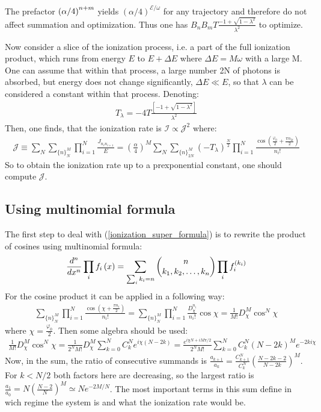 The prefactor $  \left(\alpha/4\right)^{n+m} $ yields $ (\alpha/4)^{\mathcal{E}/\omega} $ for any trajectory and therefore do not affect summation and optimization. Thus one has $ B_{n}B_{m}T\frac{-1+\sqrt{1-\lambda^{2}}}{\lambda^{2}} $ to optimize.

Now consider a slice of the ionization process, i.e. a part of the full ionization product, which runs from energy $ E $ to $ E+\Delta E $ where $ \Delta E=M\omega $ with a large M. One can assume that within that process, a large number 2N of photons is absorbed, but energy does not change significantly, $ \Delta E\ll E $, so that $ \lambda $ can be considered a constant within that process. Denoting:
\begin{gather}
	T_{\lambda}=-4T\frac{\left[-1+\sqrt{1-\lambda^{2}}\right]}{\lambda^{2}}
\end{gather}
Then, one finds, that the ionization rate is $ \mathcal{I}\propto\mathcal{J}^2 $ where:
\begin{gather}
\label{ionization_super_formula}
\mathcal{J}
\equiv
\sum_N
\sum_{\{n\}_{N}^{M}}\prod_{i=1}^{N}\frac{J_{n_{i}n_{i+1}}}{E}
=
\left(\frac{\alpha}{4}\right)^{M}
\sum_N
\sum_{\{n\}_{2N}^{M}}(-T_{\lambda})^{\frac{N}{2}}\prod_{i=1}^{N}\frac{\cos(\frac{\varphi_{0}}{2}+\frac{\pi n_{2i}}{2})}{n_{i}!}
\end{gather}
So to obtain the ionization rate up to a prexponential constant, one should compute $ \mathcal{J} $.

\subsection{Using multinomial formula}
The first step to deal with (\ref{ionization_super_formula}) is to rewrite the product of cosines using multinomial formula:
\begin{gather}
	\frac{d^n}{dx^n}
	\prod_i f_i\left(x\right)
	=
	\sum_{\sum_i k_i=n}
	\begin{pmatrix}
	n
	\\
	k_1,k_2,\dots,k_n
	\end{pmatrix}
	\prod_i
	f_i^{(k_i)}
\end{gather}
For the cosine product it can be applied in a following way:
\begin{gather}
	\sum_{\{n\}_{N}^{M}}\prod_{i=1}^{N}\frac{\cos(\chi+\frac{\pi n_{i}}{2})}{n_{i}!}=\sum_{\{n\}_{N}^{M}}\prod_{i=1}^{N}\frac{D_{\chi}^{n_{i}}}{n_{i}!}\cos\chi=\frac{1}{M!}D_{\chi}^{M}\cos^{N}\chi
\end{gather}
where $ \chi=\frac{\varphi_0 }{2}$. Then some algebra should be used:
\begin{multline}
\label{after_multinomial}
	\frac{1}{M!}D_{\chi}^{M}\cos^{N}\chi=
	\frac{1}{2^{N}M!}D_{\chi}^{M}\sum_{k=0}^{N}C_{k}^{N}e^{i\chi(N-2k)}
	=
	\frac{e^{i\chi N+iM\pi/2}}{2^{N}M!}\sum_{k=0}^{N}C_{k}^{N}(N-2k)^{M}e^{-2ki\chi}
\end{multline}
Now, in the sum, the ratio of consecutive summands is $ \frac{a_{k+1}}{a_{k}}=\frac{C_{k+1}^{N}}{C_{k}^{N}}\left(\frac{N-2k-2}{N-2k}\right)^{M} $. For $ k<N/2 $ both factors here are decreasing, so the largest ratio is $ \frac{a_{1}}{a_{0}}=N(\frac{N-2}{N})^{M}\simeq Ne^{-2M/N} $. The most important terms in this sum define in wich regime the system is and what the ionization rate would be. 

